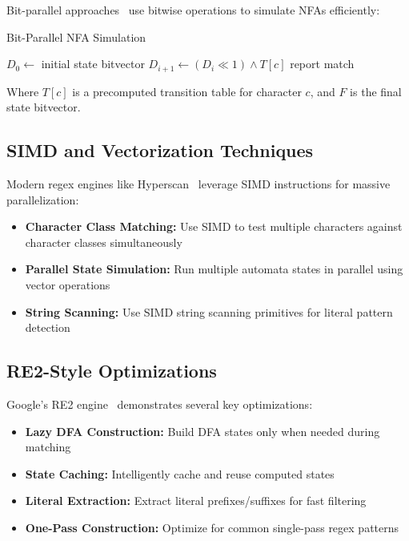 \documentclass[11pt,a4paper]{article}
\begin{document}
Bit-parallel approaches~\cite{baeza1992new,myers1999fast} use bitwise operations to simulate NFAs efficiently:

\begin{algorithm}
\caption{Bit-Parallel NFA Simulation}
\begin{algorithmic}[1]
\State $D_0 \gets$ initial state bitvector
    \State $D_{i+1} \gets (D_i \ll 1) \land T[c]$
        \State report match
    \EndIf
\EndFor
\end{algorithmic}
\end{algorithm}

Where $T[c]$ is a precomputed transition table for character $c$, and $F$ is the final state bitvector.

\subsection{SIMD and Vectorization Techniques}

Modern regex engines like Hyperscan~\cite{intel2016hyperscan} leverage SIMD instructions for massive parallelization:

\begin{itemize}
\item \textbf{Character Class Matching:} Use SIMD to test multiple characters against character classes simultaneously
\item \textbf{Parallel State Simulation:} Run multiple automata states in parallel using vector operations
\item \textbf{String Scanning:} Use SIMD string scanning primitives for literal pattern detection
\end{itemize}

\subsection{RE2-Style Optimizations}

Google's RE2 engine~\cite{cox2007regular} demonstrates several key optimizations:

\begin{itemize}
\item \textbf{Lazy DFA Construction:} Build DFA states only when needed during matching
\item \textbf{State Caching:} Intelligently cache and reuse computed states
\item \textbf{Literal Extraction:} Extract literal prefixes/suffixes for fast filtering
\item \textbf{One-Pass Construction:} Optimize for common single-pass regex patterns
\end{itemize}
\end{document}
